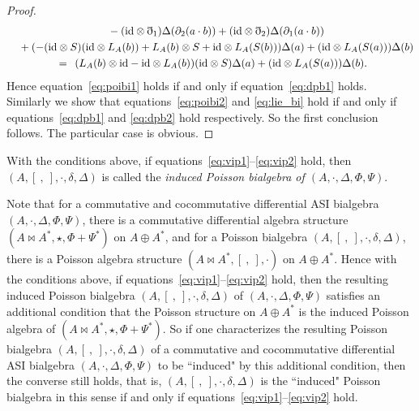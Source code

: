 \documentclass[10pt,a4paper]{amsart}
\numberwithin{equation}{section}
\newcommand{\id}{\mathrm{id}}
\begin{document}
\begin{proof}
\begin{gather*}
 \quad {}- (\id \otimes \eth_1)\Delta(\partial_2(a \cdot b)) + (\id \otimes \eth_2)\Delta(\partial_1(a \cdot b)) \\
 \quad {}+ ( - (\id \otimes S)(\id \otimes L_A(b)) + L_A(b) \otimes S + \id \otimes L_A(S(b)) ) \Delta(a) + ( \id \otimes L_A(S(a)) ) \Delta(b) \\
 \overset{\hphantom{(3.2)}}{=} (L_A(b) \otimes \id - \id \otimes L_A(b))(\id \otimes S) \Delta(a) + ( \id \otimes L_A(S(a)) ) \Delta(b).
	\end{gather*}
 Hence equation~\eqref{eq:poibi1} holds if and only if equation~\eqref{eq:dpb1} holds.
 Similarly we show that equations~\eqref{eq:poibi2} and \eqref{eq:lie_bi} hold if and only if equations~\eqref{eq:dpb1} and \eqref{eq:dpb2} hold respectively.
 So the first conclusion follows. The particular case is obvious.
\end{proof}


With the conditions above, if equations~\eqref{eq:vip1}--\eqref{eq:vip2} hold, then $(A, [\ ,\ ], \cdot, \delta, \Delta)$ is called the \textit{induced Poisson bialgebra of $(A, \cdot, \Delta, \Phi, \Psi)$}.

\begin{Remark}\label{rmk:iff}
 Note that for a commutative and cocommutative differential ASI bialgebra $(A, \cdot, \Delta, \Phi, \Psi)$,
 there is a commutative differential algebra structure $(A \bowtie A^*, \star, \Phi + \Psi^*)$ on $A \oplus A^*$,
 and for a Poisson bialgebra $(A, [\ ,\ ], \cdot, \delta, \Delta)$,
 there is a Poisson algebra structure $(A \bowtie A^*, [\ ,\ ], \cdot)$ on $A \oplus A^*$.
 Hence with the conditions above, if equations~\eqref{eq:vip1}--\eqref{eq:vip2} hold,
 then the resulting induced Poisson bialgebra $(A, [\ ,\ ], \cdot, \delta, \Delta)$ of $(A, \cdot, \Delta, \Phi, \Psi)$ satisfies an additional condition that the Poisson structure on $A \oplus A^*$ is the induced Poisson algebra of $(A \bowtie A^*, \star,\allowbreak \Phi + \Psi^*)$.
 So if one characterizes the resulting Poisson bialgebra $(A, [\ ,\ ], \cdot, \delta, \Delta)$ of a commutative and cocommutative differential ASI bialgebra $(A, \cdot, \Delta, \Phi, \Psi)$ to be ``induced" by this additional condition,
 then the converse still holds, that is,
 $(A, [\ ,\ ], \cdot, \delta, \Delta)$ is the ``induced" Poisson bialgebra in this sense if and only if equations~\eqref{eq:vip1}--\eqref{eq:vip2} hold.
\end{Remark}
\end{document}
